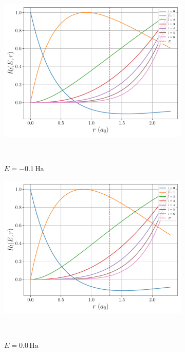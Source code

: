 \documentclass[a4paper,DIV=12,english]{scrartcl}
\begin{document}
\begin{figure}
    \centering 
    \begin{subfigure}{0.49\textwidth}
        \centering 
        \includegraphics[width=\textwidth]{../plots/mtins/-0.1.pdf}
        \caption{$E = -0.1 \, \text{Ha}$}\
        \label{subfig:mtin_-0.1}
    \end{subfigure}
    \begin{subfigure}{0.49\textwidth}
        \centering 
        \includegraphics[width=\textwidth]{../plots/mtins/0.pdf}
        \caption{$E = 0.0 \, \text{Ha}$}\
        \label{subfig:mtin_0}
    \end{subfigure}
    \begin{subfigure}{0.49\textwidth}

\end{subfigure}
\end{figure}
\end{document}
